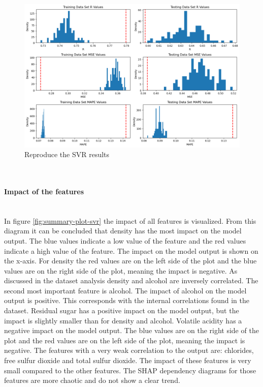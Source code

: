 \documentclass{article}
\newcommand{\subsubsubsection}[1]{%
  \paragraph{#1}\mbox{}\\}
\begin{document}
\begin{figure}
\centering
\includegraphics[width=\linewidth]{figures/SVR_reproduce_the_results.png}
\caption{Reproduce the SVR results}
\label{fig:Reproduce-SVR-the-results}
\end{figure}

\subsubsubsection{Impact of the features}
In figure \autoref{fig:summary-plot-svr}  the impact of all features is visualized.
From this diagram it can be concluded that density has the most impact on the model output.
The blue values indicate a low value of the feature and the red values indicate a high value of the feature.
The impact on the model output is shown on the x-axis.
For density the red values are on the left side of the plot and the blue values are on the right side of the plot, meaning the impact is negative.
As discussed in the dataset analysis density and alcohol are inversely correlated.
The second most important feature is alcohol. The impact of alcohol on the model output is positive.
This corresponds with the internal correlations found in the dataset.
Residual sugar has a positive impact on the model output, but the impact is slightly smaller than for density and alcohol.
Volatile acidity has a negative impact on the model output. The blue values are on the right side of the plot and the red values are on the left side of the plot, meaning the impact is negative.
The features with a very weak correlation to the output are: chlorides, free sulfur dioxide and total sulfur dioxide. The impact of these features is very small compared to the other features.
The SHAP dependency diagrams for those features are more chaotic and do not show a clear trend.
\end{document}
